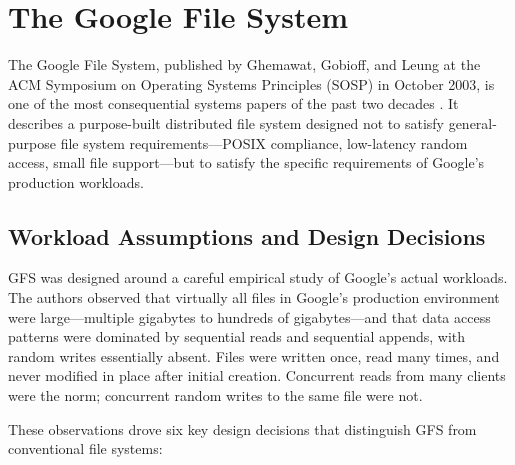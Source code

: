 \section{The Google File System}
\label{sec:gfs}

The Google File System, published by Ghemawat, Gobioff, and Leung at
the ACM Symposium on Operating Systems Principles (SOSP) in October
2003, is one of the most consequential systems papers of the past two
decades \parencite{GFS2003}. It describes a purpose-built distributed
file system designed not to satisfy general-purpose file system
requirements---POSIX compliance, low-latency random access, small
file support---but to satisfy the specific requirements of Google's
production workloads.

\subsection{Workload Assumptions and Design Decisions}
\label{subsec:gfs-workload}

GFS was designed around a careful empirical study of Google's actual
workloads. The authors observed that virtually all files in Google's
production environment were large---multiple gigabytes to hundreds of
gigabytes---and that data access patterns were dominated by sequential
reads and sequential appends, with random writes essentially absent.
Files were written once, read many times, and never modified in place
after initial creation. Concurrent reads from many clients were the
norm; concurrent random writes to the same file were not.

These observations drove six key design decisions that distinguish GFS
from conventional file systems:

